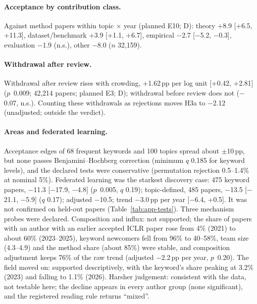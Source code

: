\paragraph{Acceptance by contribution class.} Against method papers within topic $\times$ year (planned E10; D):
theory +8.9 [+6.5, +11.3], dataset/benchmark +3.9 [+1.1, +6.7], empirical $-$2.7 [$-$5.2, $-$0.3], evaluation $-$1.9
(n.s.), other $-$8.0 ($n$ 32,159).

\paragraph{Withdrawal after review.} Withdrawal after review rises with crowding, +1.62\,pp per log unit [+0.42,
+2.81] ($p$~0.009; 42,214 papers; planned E3; D); withdrawal before review does not ($-$0.07, n.s.). Counting these
withdrawals as rejections moves H3a to $-$2.12 (unadjusted; outside the verdict).

\paragraph{Areas and federated learning.} Acceptance edges of 68 frequent keywords and 100 topics spread about
$\pm$10\,pp, but none passes Benjamini--Hochberg correction (minimum $q$ 0.185 for keyword levels), and the declared
tests were conservative (permutation rejection 0.5--1.4\% at nominal 5\%). Federated learning was the starkest
discovery case: 475 keyword papers, $-$11.3 [$-$17.9, $-$4.8] ($p$~0.005, $q$ 0.19); topic-defined, 485 papers,
$-$13.5 [$-$21.1, $-$5.9] ($q$ 0.17); adjusted $-$10.5; trend $-$3.0\,pp per year [$-$6.4, +0.5]. It was not confirmed
on held-out papers (Table~\ref{tab:app-tests}). Three mechanism probes were declared. Composition and influx: not
supported; the share of papers with an author with an earlier accepted ICLR paper rose from 4\% (2021) to about 60\%
(2023--2025), keyword newcomers fell from 96\% to 40--58\%, team size (4.3--4.9) and the method share (about 85\%)
were stable, and composition adjustment keeps 76\% of the raw trend (adjusted $-$2.2\,pp per year, $p$~0.20). The field
moved on: supported descriptively, with the keyword's share peaking at 3.2\% (2023) and falling to 1.1\% (2026).
Harsher judgement: consistent with the data, not testable here; the decline appears in every author group (none
significant), and the registered reading rule returns ``mixed''.

